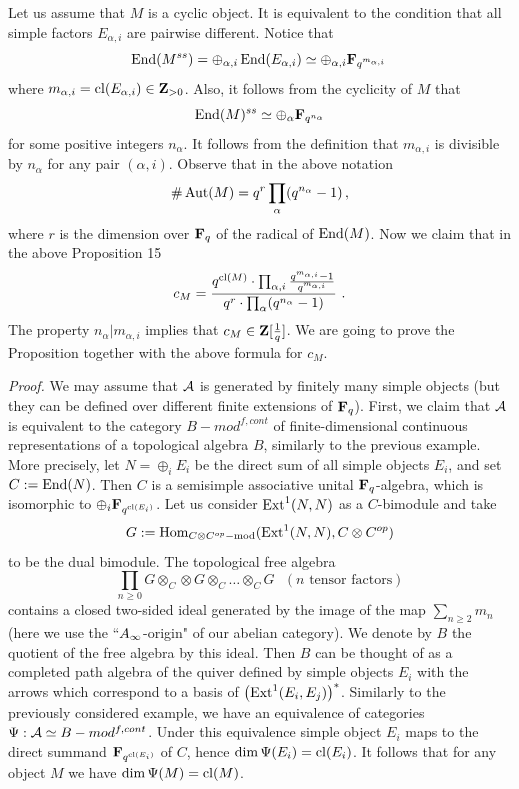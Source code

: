 \documentclass[12pt]{article}
\begin{document}
Let us assume that $M$ is a cyclic object. It is equivalent to the condition that
 all simple factors $E_{\alpha,i}$ are pairwise different.
 Notice
that 
$$\operatorname{End}(M^{ss})=\oplus_{\alpha,i} \operatorname{End}(E_{\alpha,i})\simeq \oplus_{\alpha,i}{\bf F}_{q^{m_{\alpha,i}}}\,$$ where $m_{\alpha,i}=\operatorname{cl}(E_{\alpha,i})\in {\bf Z}_{> 0}$.
Also, it follows from the cyclicity of $M$  that 
$$\operatorname{End}(M)^{ss}\simeq\oplus_{\alpha}{\bf F}_{q^{n_{\alpha}}}$$ for some
positive integers $n_{\alpha}$. It follows from the definition that $m_{\alpha,i}$ is divisible by  $n_{\alpha}$ for any pair $(\alpha,i)$. Observe that in the above notation 
$$\#\operatorname{Aut}(M)=q^r\prod_{\alpha}(q^{n_{\alpha}}-1)\,,$$ where $r$ is the dimension over ${\bf F}_q$ of the radical of $\operatorname{End}(M)$. Now we claim that in the above Proposition 15
$$c_M={q^{\operatorname{cl}(M)}\cdot \prod_{\alpha,i}{q^{m_{\alpha,i}}-1\over{q^{m_{\alpha,i}}}}\over{q^r\cdot \prod_{\alpha}(q^{n_{\alpha}}-1)}
}\,\,.$$
The property $n_{\alpha}|m_{\alpha,i}$  implies that $c_M\in {\bf Z}[{1\over{q}}]$.
We are going to prove the Proposition together with the above formula for $c_M$.

{\it Proof.} We may assume that ${\cal A}$ is generated by finitely many simple objects (but they can be defined over different finite extensions of ${\bf F}_q$). First, we claim that ${\cal A}$ is equivalent to the category $B-mod^{f,cont}$ of finite-dimensional continuous representations of a topological algebra $B$, similarly to the previous example. More precisely, let $N=\oplus_iE_i$ be the direct sum of all simple objects $E_i$, and set $C:=\operatorname{End}(N)$. Then $C$ is a semisimple associative unital ${\bf F}_q$-algebra, which is isomorphic to $\oplus_i{\bf F}_{q^{\operatorname{cl}(E_i)}}$. Let us consider $\operatorname{Ext}^1(N,N)$ as a $C$-bimodule and take
$$G:=\operatorname{Hom}_{C\otimes C^{op}-\operatorname{mod}}(\operatorname{Ext}^1(N,N), C\otimes C^{op})$$
to be the dual bimodule. The topological free algebra 
$$\prod_{n\geqslant 0}
{G\otimes_C\otimes G\otimes_C\dots\otimes_CG}\,\,\,\,({n\mbox{ tensor factors}})$$ contains a closed two-sided ideal generated by the image of the map $\sum_{n\geqslant 2}m_n$ (here we use the ``$A_{\infty}$-origin" of our abelian category). We denote by $B$ the quotient of the free algebra by this ideal. Then $B$ can be thought of as a completed path algebra of the quiver defined by simple objects $E_i$ with the arrows which correspond to a basis of 
$\left(\operatorname{Ext}^1(E_i,E_j)\right)^\ast$.  Similarly to the previously considered example,
 we have an equivalence of categories $\Psi:{\cal A}\simeq B-mod^{f,cont}$. Under this equivalence  simple object $E_i$
maps to the direct summand 
${\bf F}_{q^{\operatorname{cl}(E_i)}}$ of $C$, hence $\dim \Psi(E_i)=\operatorname{cl}(E_i)$. It follows that for any object $M$ we have $\dim  \Psi(M)=\operatorname{cl}(M)$.
\end{document}
